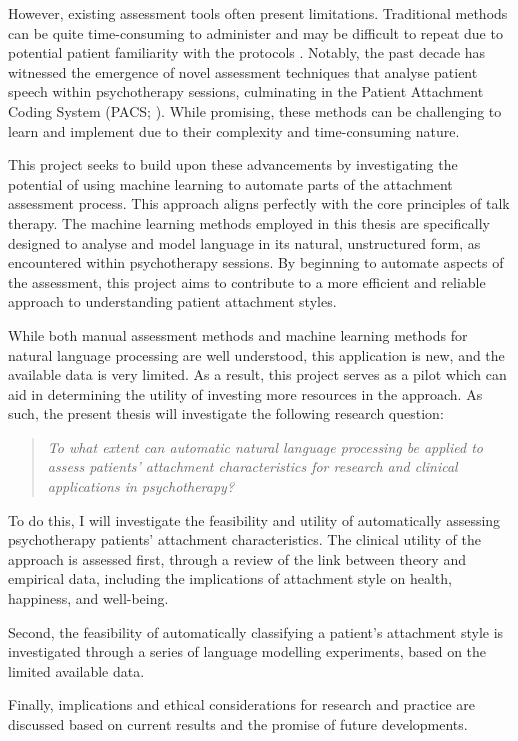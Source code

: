 \documentclass[12pt]{report}
\begin{document}
However, existing assessment tools often present limitations.
Traditional methods can be quite time-consuming to administer and may be difficult to repeat due to potential patient familiarity with the protocols \cite{Daniel2015}.
Notably, the past decade has witnessed the emergence of novel assessment techniques that analyse patient speech within psychotherapy sessions, culminating in the Patient Attachment Coding System (PACS; ).
While promising, these methods can be challenging to learn and implement due to their complexity and time-consuming nature.

This project seeks to build upon these advancements by investigating the potential of using machine learning to automate parts of the attachment assessment process.
This approach aligns perfectly with the core principles of talk therapy.
The machine learning methods employed in this thesis are specifically designed to analyse and model language in its natural, unstructured form, as encountered within psychotherapy sessions.
By beginning to automate aspects of the assessment, this project aims to contribute to a more efficient and reliable approach to understanding patient attachment styles.

While both manual assessment methods and machine learning methods for natural language processing are well understood, this application is new, and the available data is very limited.
As a result, this project serves as a pilot which can aid in determining the utility of investing more resources in the approach.
As such, the present thesis will investigate the following research question:
\begin{quote}
    \textit{To what extent can automatic natural language processing be applied to assess patients' attachment characteristics for research and clinical applications in psychotherapy?}
\end{quote}
To do this, I will investigate the feasibility and utility of automatically assessing psychotherapy patients' attachment characteristics.
The clinical utility of the approach is assessed first, through a review of the link between theory and empirical data, including the implications of attachment style on health, happiness, and well-being.

Second, the feasibility of automatically classifying a patient's attachment style is investigated through a series of language modelling experiments, based on the limited available data.

Finally, implications and ethical considerations for research and practice are discussed based on current results and the promise of future developments.
\end{document}
